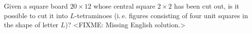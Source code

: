 \problem{}
Given a square board $20 \times 12$ whose central square $2 \times 2$ has been
cut out, is it possible to cut it into $L$-tetraminoes
(i.\,e. figures consisting of four unit squares in the shape of letter $L$)?
\solution
<FIXME: Missing English solution.>
\endproblem
